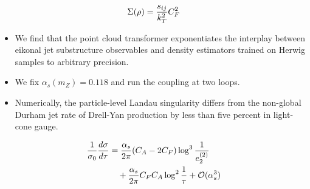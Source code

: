\begin{equation}
  \Sigma(\rho) = \frac{s_{ij}}{k_T^2} C_F^2
  \label{eq:6}
\end{equation}

\begin{itemize}
  \item We find that the point cloud transformer exponentiates the interplay between eikonal jet substructure observables and density estimators trained on Herwig samples to arbitrary precision.
  \item We fix $\alpha_s(m_Z) = 0.118$ and run the coupling at two loops.
  \item Numerically, the particle-level Landau singularity differs from the non-global Durham jet rate of Drell-Yan production by less than five percent in light-cone gauge.
\end{itemize}

\begin{align}
  \frac{1}{\sigma_0} \frac{d\sigma}{d\tau} &= \frac{\alpha_s}{2\pi} (C_A - 2C_F) \log^{3} \frac{1}{e_2^{(2)}} \nonumber \\
  &\quad + \frac{\alpha_s}{2\pi} C_F C_A \log^{2} \frac{1}{\tau} + \mathcal{O}(\alpha_s^3) \label{eq:7}
\end{align}

